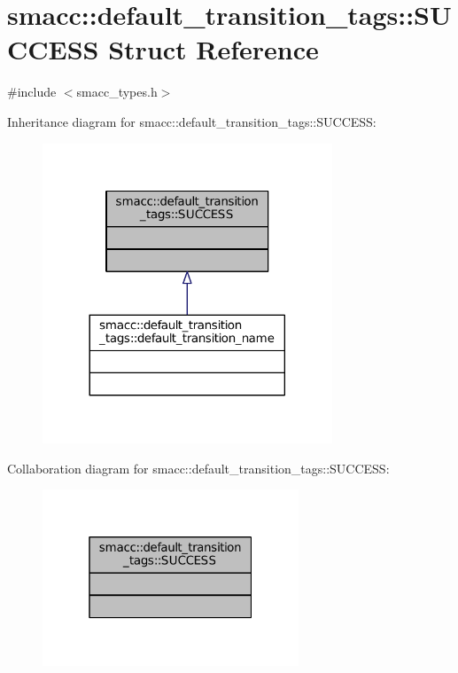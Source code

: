 \hypertarget{structsmacc_1_1default__transition__tags_1_1SUCCESS}{}\section{smacc\+:\+:default\+\_\+transition\+\_\+tags\+:\+:S\+U\+C\+C\+E\+SS Struct Reference}
\label{structsmacc_1_1default__transition__tags_1_1SUCCESS}


{\ttfamily \#include $<$smacc\+\_\+types.\+h$>$}



Inheritance diagram for smacc\+:\+:default\+\_\+transition\+\_\+tags\+:\+:S\+U\+C\+C\+E\+SS\+:
\nopagebreak
\begin{figure}[H]
\begin{center}
\leavevmode
\includegraphics[width=245pt]{structsmacc_1_1default__transition__tags_1_1SUCCESS__inherit__graph}
\end{center}
\end{figure}


Collaboration diagram for smacc\+:\+:default\+\_\+transition\+\_\+tags\+:\+:S\+U\+C\+C\+E\+SS\+:
\nopagebreak
\begin{figure}[H]
\begin{center}
\leavevmode
\includegraphics[width=217pt]{structsmacc_1_1default__transition__tags_1_1SUCCESS__coll__graph}
\end{center}
\end{figure}



